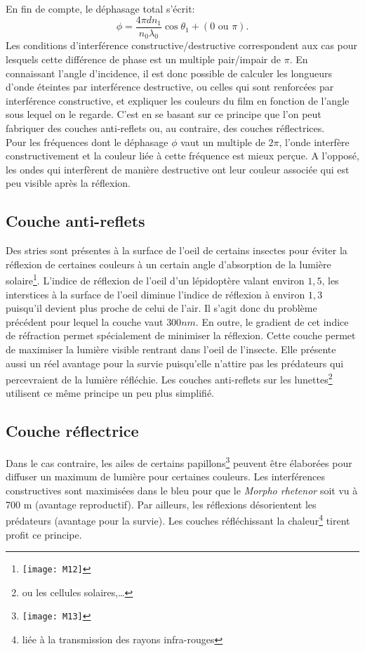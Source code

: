 En fin de compte, le déphasage total s'écrit:
$$\phi=\frac{4\pi dn_1}{n_0\lambda_0 }\cos \theta_1+(0\mbox{ ou }\pi).$$
Les conditions d'interférence constructive/destructive correspondent aux cas pour lesquels cette différence de phase est un multiple pair/impair de $\pi$. En connaissant l'angle d'incidence, il est donc possible de calculer les longueurs d'onde éteintes par interférence destructive, ou celles qui sont renforcées par interférence constructive, et expliquer les couleurs du film en fonction de l'angle sous lequel on le regarde. C'est en se basant sur ce principe que l'on peut
fabriquer des couches anti-reflets ou, au contraire, des couches réflectrices.\\

Pour les fréquences dont le déphasage $\phi$ vaut un multiple de $2\pi$, l'onde interfère constructivement et la couleur liée à cette fréquence est mieux perçue. A l'opposé, les ondes qui interfèrent de manière destructive ont leur couleur associée qui est peu visible après la réflexion.

\subsection{Couche anti-reflets}

Des stries sont présentes à la surface de l'oeil de certains insectes pour éviter la réflexion de certaines couleurs à un certain angle d'absorption de la lumière solaire\footnote{\texttt{[image: M12]}}. L'indice de réflexion de l'oeil d'un lépidoptère valant environ $1,5$, les interstices à la surface de l'oeil diminue l'indice de réflexion à environ $1,3$ puisqu'il devient plus proche de celui de l'air. Il s'agit donc du problème précédent pour lequel la couche vaut $300nm$. En outre, le gradient de cet indice de réfraction permet spécialement de minimiser la réflexion. Cette couche permet de maximiser la lumière visible rentrant dans l'oeil de l'insecte. Elle présente aussi un réel avantage pour la survie puisqu'elle n'attire pas les prédateurs qui percevraient de la lumière réfléchie. Les couches anti-reflets sur les lunettes\footnote{ou les cellules solaires,…} utilisent ce même principe un peu plus simplifié.
\newpage

\subsection{Couche réflectrice}

Dans le cas contraire, les ailes de certains papillons\footnote{\texttt{[image: M13]}} peuvent être élaborées pour diffuser un maximum de lumière pour certaines couleurs. Les interférences constructives sont maximisées dans le bleu pour que le \textit{Morpho rhetenor} soit vu à 700 m (avantage reproductif).	Par ailleurs, les réflexions désorientent les prédateurs (avantage pour la survie). Les couches réfléchissant la chaleur\footnote{liée à la transmission des rayons infra-rouges} tirent profit ce principe.

